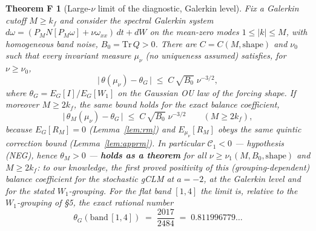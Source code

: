 \documentclass[11pt]{article}
\theoremstyle{remark}
\theoremstyle{plain}
\newtheorem*{thmF}{Theorem F}
\begin{document}
\begin{thmF}[Large-$\nu$ limit of the diagnostic, Galerkin level]
Fix a Galerkin cutoff $M \ge k_f$ and consider the spectral Galerkin system
$d\omega = (P_M N[P_M\omega] + \nu\omega_{xx})\,dt + dW$ on the mean-zero modes
$1 \le |k| \le M$, with homogeneous band noise, $B_0 = \mathrm{Tr}\,Q > 0$. There
are $C = C(M,\text{shape})$ and $\nu_0$ such that \emph{every} invariant measure
$\mu_\nu$ (no uniqueness assumed) satisfies, for $\nu \ge \nu_0$,
\begin{equation}
   \bigl|\,\theta(\mu_\nu) - \theta_G\,\bigr| \;\le\; C\,\sqrt{B_0}\;\nu^{-3/2},
\end{equation}
where $\theta_G = E_G[I]/E_G[W_1]$ on the Gaussian OU law of the forcing shape. If
moreover $M \ge 2k_f$, the same bound holds for the exact balance coefficient,
\begin{equation}
   \bigl|\,\theta_M(\mu_\nu) - \theta_G\,\bigr| \;\le\; C\,\sqrt{B_0}\;\nu^{-3/2}
   \qquad (M \ge 2k_f),
\end{equation}
because $E_G[R_M] = 0$ (Lemma~\ref{lem:rm}) and $E_{\mu_\nu}[R_M]$ obeys the same
quintic correction bound (Lemma~\ref{lem:apprm}). In particular $\mathcal{C}_1 < 0$
--- hypothesis (NEG), hence $\theta_M > 0$ ---
\textbf{holds as a theorem} for all $\nu \ge \nu_1(M, B_0, \text{shape})$ and $M \ge 2k_f$: to our
knowledge, the first proved positivity of this (grouping-dependent) balance
coefficient for the stochastic gCLM at $a=-2$, at the Galerkin level and for the stated
$W_1$-grouping. For the flat band $[1,4]$ the limit is, relative to the
$W_1$-grouping of \S5, the exact rational number
\begin{equation}
   \theta_G(\text{band}\,[1,4]) \;=\; \frac{2017}{2484} \;=\; 0.811996779\ldots
\end{equation}
\end{thmF}
\end{document}
